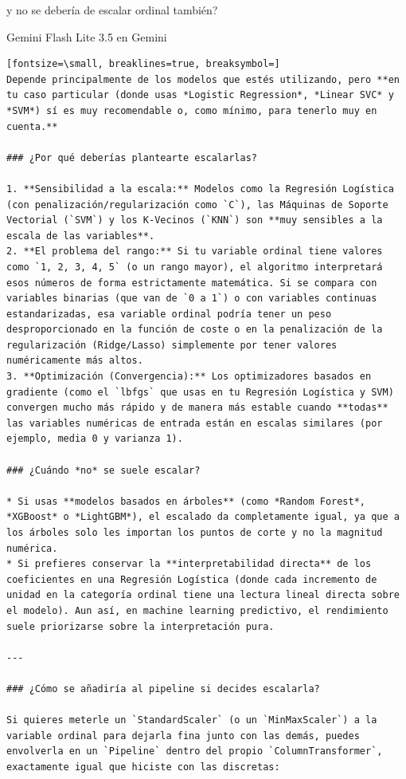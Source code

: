 \documentclass[12pt,a4paper,oneside]{book}
\begin{document}
\begin{iaprompt}
y no se debería de escalar ordinal también?
\end{iaprompt}
\begin{iaresp}{Gemini Flash Lite 3.5 en Gemini}
\begin{Verbatim}[fontsize=\small, breaklines=true, breaksymbol=]
Depende principalmente de los modelos que estés utilizando, pero **en tu caso particular (donde usas *Logistic Regression*, *Linear SVC* y *SVM*) sí es muy recomendable o, como mínimo, para tenerlo muy en cuenta.**

### ¿Por qué deberías plantearte escalarlas?

1. **Sensibilidad a la escala:** Modelos como la Regresión Logística (con penalización/regularización como `C`), las Máquinas de Soporte Vectorial (`SVM`) y los K-Vecinos (`KNN`) son **muy sensibles a la escala de las variables**.
2. **El problema del rango:** Si tu variable ordinal tiene valores como `1, 2, 3, 4, 5` (o un rango mayor), el algoritmo interpretará esos números de forma estrictamente matemática. Si se compara con variables binarias (que van de `0 a 1`) o con variables continuas estandarizadas, esa variable ordinal podría tener un peso desproporcionado en la función de coste o en la penalización de la regularización (Ridge/Lasso) simplemente por tener valores numéricamente más altos.
3. **Optimización (Convergencia):** Los optimizadores basados en gradiente (como el `lbfgs` que usas en tu Regresión Logística y SVM) convergen mucho más rápido y de manera más estable cuando **todas** las variables numéricas de entrada están en escalas similares (por ejemplo, media 0 y varianza 1).

### ¿Cuándo *no* se suele escalar?

* Si usas **modelos basados en árboles** (como *Random Forest*, *XGBoost* o *LightGBM*), el escalado da completamente igual, ya que a los árboles solo les importan los puntos de corte y no la magnitud numérica.
* Si prefieres conservar la **interpretabilidad directa** de los coeficientes en una Regresión Logística (donde cada incremento de unidad en la categoría ordinal tiene una lectura lineal directa sobre el modelo). Aun así, en machine learning predictivo, el rendimiento suele priorizarse sobre la interpretación pura.

---

### ¿Cómo se añadiría al pipeline si decides escalarla?

Si quieres meterle un `StandardScaler` (o un `MinMaxScaler`) a la variable ordinal para dejarla fina junto con las demás, puedes envolverla en un `Pipeline` dentro del propio `ColumnTransformer`, exactamente igual que hiciste con las discretas:


\end{Verbatim}
\end{iaresp}
\end{document}
